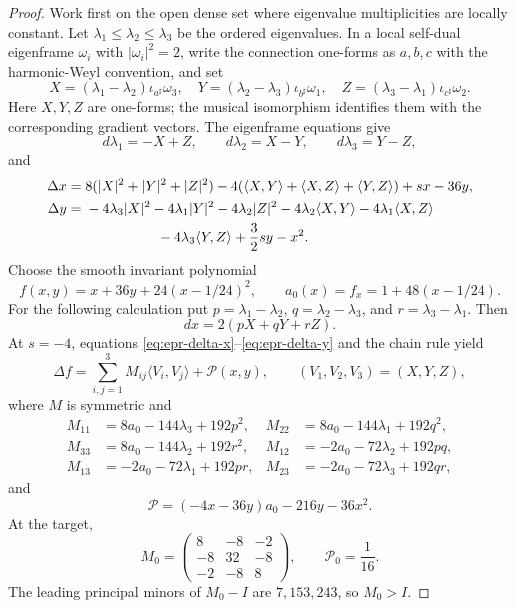 \begin{proof}
Work first on the open dense set where eigenvalue multiplicities
are locally constant.  Let $\lambda_1\leq\lambda_2\leq\lambda_3$
be the ordered eigenvalues.  In a local self-dual eigenframe
$\omega_i$ with $|\omega_i|^2=2$, write the connection one-forms
as $a,b,c$ with the harmonic-Weyl convention, and set
\[
 X=(\lambda_1-\lambda_2)\iota_{a^\sharp}\omega_3,\quad
 Y=(\lambda_2-\lambda_3)\iota_{b^\sharp}\omega_1,\quad
 Z=(\lambda_3-\lambda_1)\iota_{c^\sharp}\omega_2.
\]
Here $X,Y,Z$ are one-forms; the musical isomorphism identifies them
with the corresponding gradient vectors.  The eigenframe equations
give
\begin{equation}\label{eq:epr-first-jets}
 d\lambda_1=-X+Z,\qquad
 d\lambda_2=X-Y,\qquad
 d\lambda_3=Y-Z,
\end{equation}
and
\begin{align}
 \Delta x={}&8(|X|^2+|Y|^2+|Z|^2)
 -4(\langle X,Y\rangle+\langle X,Z\rangle+\langle Y,Z\rangle)
 +sx-36y,\label{eq:epr-delta-x}\\
 \Delta y={}&-4\lambda_3|X|^2-4\lambda_1|Y|^2-4\lambda_2|Z|^2
 -4\lambda_2\langle X,Y\rangle-4\lambda_1\langle X,Z\rangle
 \nonumber\\
 &\hspace{18mm}-4\lambda_3\langle Y,Z\rangle
 +\frac32sy-x^2.\label{eq:epr-delta-y}
\end{align}
Choose the smooth invariant polynomial
\begin{equation}\label{eq:epr-polynomial}
 f(x,y)=x+36y+24(x-1/24)^2,
 \qquad a_0(x)=f_x=1+48(x-1/24).
\end{equation}
For the following calculation put
$p=\lambda_1-\lambda_2$, $q=\lambda_2-\lambda_3$,
and $r=\lambda_3-\lambda_1$.  Then
\[
 dx=2(pX+qY+rZ).
\]
At $s=-4$, equations \eqref{eq:epr-delta-x}--\eqref{eq:epr-delta-y}
and the chain rule yield
\begin{equation}\label{eq:epr-polynomial-laplacian}
 \Delta f=\sum_{i,j=1}^3M_{ij}\langle V_i,V_j\rangle
                       +\mathcal P(x,y),\qquad
 (V_1,V_2,V_3)=(X,Y,Z),
\end{equation}
where $M$ is symmetric and
\begin{align*}
 M_{11}&=8a_0-144\lambda_3+192p^2,
 &M_{22}&=8a_0-144\lambda_1+192q^2,\\
 M_{33}&=8a_0-144\lambda_2+192r^2,
 &M_{12}&=-2a_0-72\lambda_2+192pq,\\
 M_{13}&=-2a_0-72\lambda_1+192pr,
 &M_{23}&=-2a_0-72\lambda_3+192qr,
\end{align*}
and
\begin{equation}\label{eq:epr-polynomial-reaction}
 \mathcal P=(-4x-36y)a_0-216y-36x^2.
\end{equation}
At the target,
\begin{equation}\label{eq:epr-target-matrix}
 M_0=\begin{pmatrix}8&-8&-2\\-8&32&-8\\-2&-8&8\end{pmatrix},
 \qquad \mathcal P_0=\frac1{16}.
\end{equation}
The leading principal minors of $M_0-I$ are $7,153,243$, so
$M_0>I$.


\end{proof}
